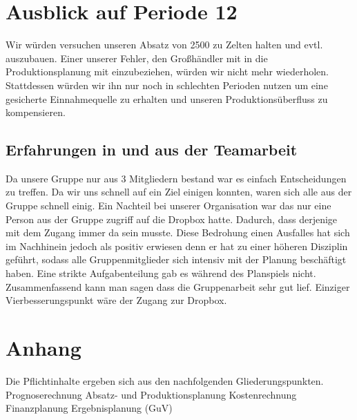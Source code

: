 \documentclass[a4paper, 12pt]{report}
\begin{document}
\begin{flushleft}
\chapter{Ausblick auf Periode 12}
Wir würden versuchen unseren Absatz von 2500 zu Zelten halten und evtl. auszubauen.
Einer unserer Fehler, den Großhändler mit in die Produktionsplanung mit einzubeziehen, würden wir nicht mehr wiederholen.
Stattdessen würden wir ihn nur noch in schlechten Perioden nutzen um eine gesicherte Einnahmequelle zu erhalten und unseren Produktionsüberfluss zu kompensieren.


\section{Erfahrungen in und aus der Teamarbeit}
Da unsere Gruppe nur aus 3 Mitgliedern bestand war es einfach Entscheidungen zu treffen.
Da wir uns schnell auf ein Ziel einigen konnten, waren sich alle aus der Gruppe schnell einig.
Ein Nachteil bei unserer Organisation war das nur eine Person aus der Gruppe zugriff auf die Dropbox hatte.
Dadurch, dass derjenige mit dem Zugang immer da sein musste.
Diese Bedrohung einen Ausfalles hat sich im Nachhinein jedoch als positiv erwiesen denn er hat zu einer höheren Disziplin geführt, sodass alle Gruppenmitglieder sich intensiv mit der Planung beschäftigt haben.
Eine strikte Aufgabenteilung gab es während des Planspiels nicht.
Zusammenfassend kann man sagen dass die Gruppenarbeit sehr gut lief.
Einziger Vierbesserungspunkt wäre  der Zugang zur Dropbox. 

\chapter{Anhang}



Die Pflichtinhalte ergeben sich aus den nachfolgenden Gliederungspunkten.
Prognoserechnung
Absatz- und Produktionsplanung
Kostenrechnung
Finanzplanung
Ergebnisplanung (GuV)

%
%


%
 

\end{flushleft}
\end{document}
